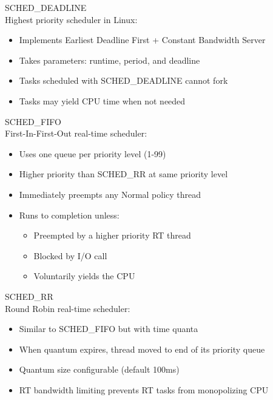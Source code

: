 \begin{definition}{SCHED\_DEADLINE}\\
    Highest priority scheduler in Linux:
    \begin{itemize}
        \item Implements Earliest Deadline First + Constant Bandwidth Server
        \item Takes parameters: runtime, period, and deadline
        \item Tasks scheduled with SCHED\_DEADLINE cannot fork
        \item Tasks may yield CPU time when not needed
    \end{itemize}
\end{definition}

\begin{definition}{SCHED\_FIFO}\\
    First-In-First-Out real-time scheduler:
    \begin{itemize}
        \item Uses one queue per priority level (1-99)
        \item Higher priority than SCHED\_RR at same priority level
        \item Immediately preempts any Normal policy thread
        \item Runs to completion unless:
            \begin{itemize}
                \item Preempted by a higher priority RT thread
                \item Blocked by I/O call
                \item Voluntarily yields the CPU
            \end{itemize}
    \end{itemize}
\end{definition}

\begin{definition}{SCHED\_RR}\\
    Round Robin real-time scheduler:
    \begin{itemize}
        \item Similar to SCHED\_FIFO but with time quanta
        \item When quantum expires, thread moved to end of its priority queue
        \item Quantum size configurable (default 100ms)
        \item RT bandwidth limiting prevents RT tasks from monopolizing CPU
    \end{itemize}
\end{definition}

